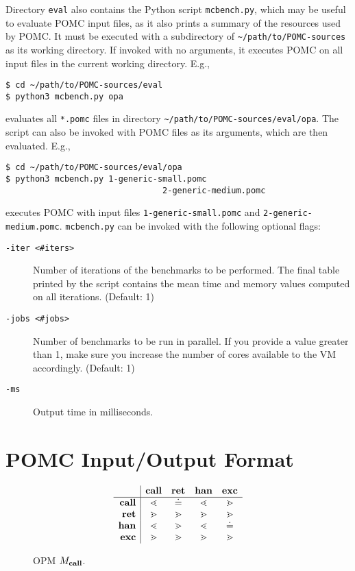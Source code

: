 \documentclass{article}
\begin{document}
Directory \verb|eval| also contains the Python script \verb|mcbench.py|,
which may be useful to evaluate POMC input files, as it also prints
a summary of the resources used by POMC.
It must be executed with a subdirectory of \verb|~/path/to/POMC-sources|
as its working directory.
If invoked with no arguments, it executes POMC on all input files in the current
working directory. E.g.,
\begin{verbatim}
$ cd ~/path/to/POMC-sources/eval
$ python3 mcbench.py opa
\end{verbatim}
evaluates all \verb|*.pomc| files in directory \verb|~/path/to/POMC-sources/eval/opa|.
The script can also be invoked with POMC files as its arguments,
which are then evaluated. E.g.,
\begin{verbatim}
$ cd ~/path/to/POMC-sources/eval/opa
$ python3 mcbench.py 1-generic-small.pomc
                                2-generic-medium.pomc
\end{verbatim}
executes POMC with input files \verb|1-generic-small.pomc| and \verb|2-generic-medium.pomc|.
\texttt{mcbench.py} can be invoked with the following optional flags:
\begin{description}
\item[\texttt{-iter <\#iters>}]
  Number of iterations of the benchmarks to be performed.
  The final table printed by the script contains the mean time
  and memory values computed on all iterations. (Default: 1)
\item[\texttt{-jobs <\#jobs>}]
  Number of benchmarks to be run in parallel.
  If you provide a value greater than 1, make sure you increase
  the number of cores available to the VM accordingly.
  (Default: 1)
\item[\texttt{-ms}]
  Output time in milliseconds.
\end{description}


\section{POMC Input/Output Format}
\label{sec:format}

\begin{figure}
\[
\begin{array}{r | c c c c}
         & \mathbf{call}   & \mathbf{ret}   & \mathbf{han} & \mathbf{exc} \\
\hline
\mathbf{call}   & \lessdot & \doteq  & \lessdot & \gtrdot \\
\mathbf{ret}    & \gtrdot  & \gtrdot & \gtrdot & \gtrdot \\
\mathbf{han} & \lessdot & \gtrdot & \lessdot & \doteq \\
\mathbf{exc}  & \gtrdot  & \gtrdot & \gtrdot  & \gtrdot \\
\end{array}
\]
\caption{OPM $M_{\mathbf{call}}$.}
\label{fig:opm}
\end{figure}
\end{document}
